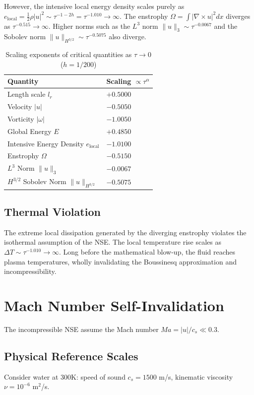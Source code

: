 \documentclass[11pt,a4paper]{article}
\theoremstyle{definition}
\begin{document}
However, the intensive local energy density scales purely as $e_{\text{local}} = \frac{1}{2}\rho |u|^2 \sim \tau^{-1-2h} = \tau^{-1.010} \to \infty$. The enstrophy $\Omega = \int |\nabla \times u|^2 dx$ diverges as $\tau^{-0.515} \to \infty$. Higher norms such as the $L^3$ norm $\|u\|_3 \sim \tau^{-0.0067}$ and the Sobolev norm $\|u\|_{H^{3/2}} \sim \tau^{-0.5075}$ also diverge.

\begin{table}[h]
\centering
\caption{Scaling exponents of critical quantities as $\tau \to 0$ ($h = 1/200$)}
\begin{tabular}{@{}ll@{}}
\toprule
Quantity & Scaling $\propto \tau^{\alpha}$ \\
\midrule
Length scale $l_r$ & $+0.5000$ \\
Velocity $|u|$ & $-0.5050$ \\
Vorticity $|\omega|$ & $-1.0050$ \\
Global Energy $E$ & $+0.4850$ \\
Intensive Energy Density $e_{\text{local}}$ & $-1.0100$ \\
Enstrophy $\Omega$ & $-0.5150$ \\
$L^3$ Norm $\|u\|_3$ & $-0.0067$ \\
$H^{3/2}$ Sobolev Norm $\|u\|_{H^{3/2}}$ & $-0.5075$ \\
\bottomrule
\end{tabular}
\end{table}

\subsection{Thermal Violation}
The extreme local dissipation generated by the diverging enstrophy violates the isothermal assumption of the NSE. The local temperature rise scales as $\Delta T \sim \tau^{-1.010} \to \infty$. Long before the mathematical blow-up, the fluid reaches plasma temperatures, wholly invalidating the Boussinesq approximation and incompressibility.

\section{Mach Number Self-Invalidation}

The incompressible NSE assume the Mach number $Ma = |u|/c_s \ll 0.3$. 

\subsection{Physical Reference Scales}
Consider water at 300K: speed of sound $c_s = 1500$ m/s, kinematic viscosity $\nu = 10^{-6}$ m$^2$/s.
\end{document}
